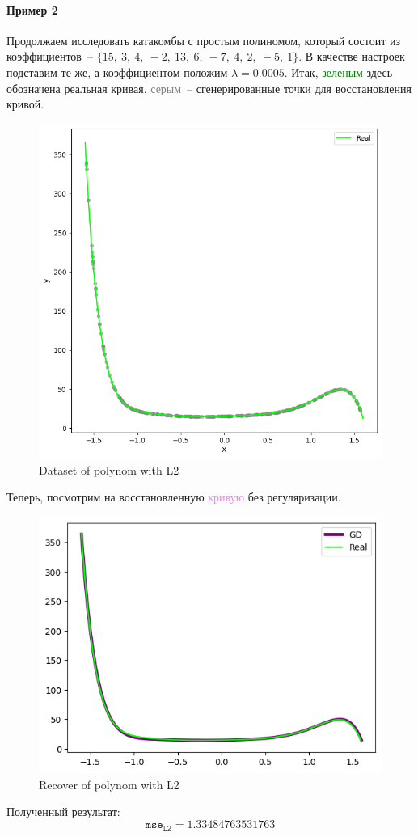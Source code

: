\documentclass[12pt, a4paper, oneside, final]{article}
\begin{document}
	\paragraph{Пример 2}
	Продолжаем исследовать катакомбы с простым полиномом, который состоит из коэффициентов~-- $\{15,~3,~4,~-2,~13,~6,~-7,~4,~2,~-5,~1\}$.
	В качестве настроек подставим те же, а коэффициентом положим $\lambda = 0.0005$.
	Итак, \textcolor{green}{зеленым} здесь обозначена реальная кривая, \textcolor{gray}{серым}~-- сгенерированные точки для восстановления кривой.
	\begin{figure}[H]
		\centering
		\includegraphics[scale = 0.8]{Image/AT2_L2_V2_DATA.png}
		\caption*{Dataset of polynom with L2}
	\end{figure}
	Теперь, посмотрим на восстановленную \textcolor{violet}{кривую} без регуляризации.
	\begin{figure}[H]
		\centering
		\includegraphics[scale = 1]{Image/AT2_L2_V2_RECOVER.png}
		\caption*{Recover of polynom with L2}
	\end{figure}
	Полученный результат:
	\[
		\mathtt{mse}_{\mathtt{L2}} = 1.33484763531763
	\]
\end{document}
